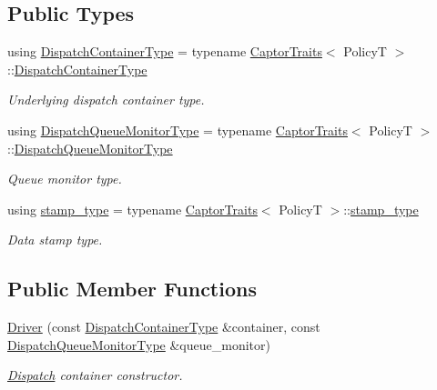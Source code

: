 \subsection*{Public Types}
\begin{DoxyCompactItemize}
\item 
\mbox{\label{classflow_1_1_driver_a422446d9a2d8ae99613e3c5728956921}} 
using \hyperlink{classflow_1_1_driver_a422446d9a2d8ae99613e3c5728956921}{Dispatch\+Container\+Type} = typename \hyperlink{structflow_1_1_captor_traits}{Captor\+Traits}$<$ PolicyT $>$\+::\hyperlink{classflow_1_1_driver_a422446d9a2d8ae99613e3c5728956921}{Dispatch\+Container\+Type}
\begin{DoxyCompactList}\small\item\em Underlying dispatch container type. \end{DoxyCompactList}\item 
\mbox{\label{classflow_1_1_driver_ab20e67754359b2e562ef594672ee8855}} 
using \hyperlink{classflow_1_1_driver_ab20e67754359b2e562ef594672ee8855}{Dispatch\+Queue\+Monitor\+Type} = typename \hyperlink{structflow_1_1_captor_traits}{Captor\+Traits}$<$ PolicyT $>$\+::\hyperlink{classflow_1_1_driver_ab20e67754359b2e562ef594672ee8855}{Dispatch\+Queue\+Monitor\+Type}
\begin{DoxyCompactList}\small\item\em Queue monitor type. \end{DoxyCompactList}\item 
\mbox{\label{classflow_1_1_driver_a29830caddd19fac6828c5f3eb8df5e65}} 
using \hyperlink{classflow_1_1_driver_a29830caddd19fac6828c5f3eb8df5e65}{stamp\+\_\+type} = typename \hyperlink{structflow_1_1_captor_traits}{Captor\+Traits}$<$ PolicyT $>$\+::\hyperlink{classflow_1_1_driver_a29830caddd19fac6828c5f3eb8df5e65}{stamp\+\_\+type}
\begin{DoxyCompactList}\small\item\em Data stamp type. \end{DoxyCompactList}\end{DoxyCompactItemize}
\subsection*{Public Member Functions}
\begin{DoxyCompactItemize}
\item 
\hyperlink{classflow_1_1_driver_a195110b2344944c9154290e3aa0e6684}{Driver} (const \hyperlink{classflow_1_1_driver_a422446d9a2d8ae99613e3c5728956921}{Dispatch\+Container\+Type} \&container, const \hyperlink{classflow_1_1_driver_ab20e67754359b2e562ef594672ee8855}{Dispatch\+Queue\+Monitor\+Type} \&queue\+\_\+monitor)
\begin{DoxyCompactList}\small\item\em \hyperlink{classflow_1_1_dispatch}{Dispatch} container constructor. \end{DoxyCompactList}\end{DoxyCompactItemize}

